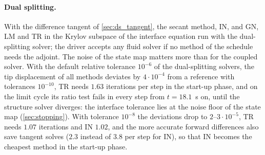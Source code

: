 \documentclass[11pt,a4paper]{article}
\theoremstyle{definition}
\theoremstyle{remark}
\begin{document}
\paragraph{Dual splitting.} With the difference tangent of \cref{sec:ds_tangent}, the secant method, IN, and GN, LM and TR in the Krylov subspace of the interface equation run with the dual-splitting solver; the driver accepts any fluid solver if no method of the schedule needs the adjoint. The noise of the state map matters more than for the coupled solver. With the default relative
tolerance $10^{-6}$ of the dual-splitting solvers, the tip displacement of all methods deviates by
$4\cdot10^{-4}$ from a reference with tolerances $10^{-10}$, TR needs $1.63$ iterations per step
in the start-up phase, and on the limit cycle its ratio test fails in every step from $t=18.1$~s
on, until the structure solver diverges: the interface tolerance lies at the noise floor of the
state map (\cref{sec:stopping}). With tolerance $10^{-8}$ the deviations drop to
$2$--$3\cdot10^{-5}$, TR needs $1.07$ iterations and IN $1.02$, and the more accurate forward
differences also save tangent solves ($2.3$ instead of $3.8$ per step for IN), so that IN becomes
the cheapest method in the start-up phase.
\end{document}
